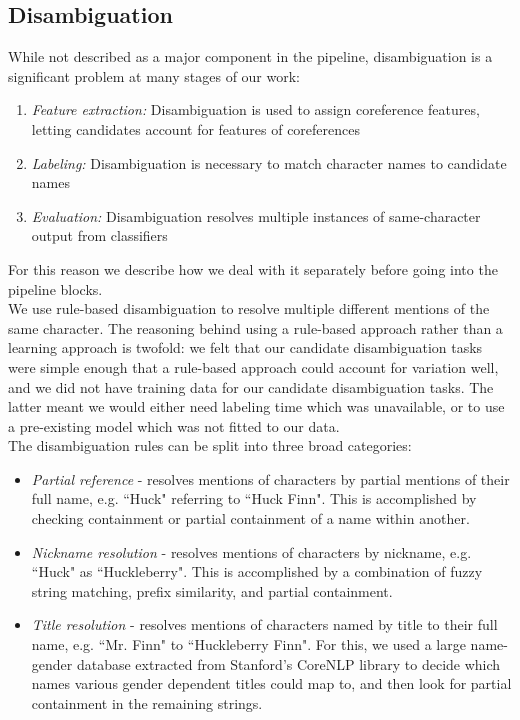 \documentclass[12pt]{article}
\begin{document}
    \subsection{Disambiguation}
        While not described as a major component in the pipeline, disambiguation is a significant problem 
        at many stages of our work:
        \begin{enumerate}
            \setlength\itemsep{0em}
            \item \emph{Feature extraction:} Disambiguation is used to assign coreference features, letting candidates account for features of coreferences 
            \item \emph{Labeling:} Disambiguation is necessary to match character names to candidate names 
            \item \emph{Evaluation:} Disambiguation resolves multiple instances of same-character output from classifiers
        \end{enumerate}
        
        For this reason we describe how we deal with it separately before going into the pipeline blocks. \\

        We use rule-based disambiguation to resolve multiple different mentions of the same character.  
        The reasoning behind using a rule-based approach rather than a learning approach is
        twofold: we felt that our candidate disambiguation tasks were simple enough that a rule-based approach 
        could account for variation well, and we did not have training data for our candidate
        disambiguation tasks. The latter meant we would either need labeling time which was unavailable, or
        to use a pre-existing model which was not fitted to our data. \\

        The disambiguation rules can be split into three broad categories:
        \begin{itemize}
            \item \emph{Partial reference} - resolves mentions of characters by partial mentions of their full
            name, e.g. ``Huck" referring to ``Huck Finn".  This is accomplished by checking containment or partial
            containment of a name within another.

            \item \emph{Nickname resolution} - resolves mentions of characters by nickname, e.g. ``Huck" as
            ``Huckleberry".  This is accomplished by a combination of fuzzy string matching, prefix similarity, and
            partial containment.

            \item \emph{Title resolution} - resolves mentions of characters named by title to their full name, e.g.
            ``Mr. Finn" to ``Huckleberry Finn".  For this, we used a large name-gender database extracted from
            Stanford's CoreNLP library to decide which names various gender dependent titles could map to, and then
            look for partial containment in the remaining strings.
        \end{itemize}
\end{document}
